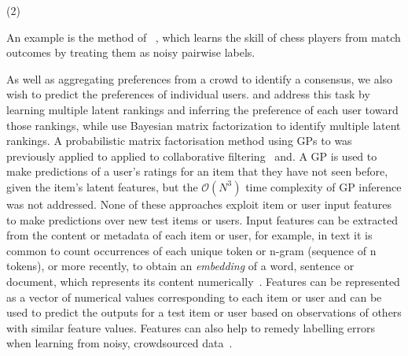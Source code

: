 (2) 

An example is the method of ~\citet{herbrich2007trueskill}, which learns the skill of chess players from 
match outcomes by treating them as noisy pairwise labels.

As well as aggregating preferences from a crowd to identify a consensus,
we also wish to predict the preferences of individual users.
\citet{yi_inferring_2013} and \citet{kim2014latent} address this task by learning
 multiple latent rankings and inferring
the preference of each user toward those rankings, while 
\citet{salimans2012collaborative} use Bayesian matrix factorization to identify multiple
latent rankings.
A probabilistic matrix factorisation method using GPs to
was previously applied to  applied to collaborative filtering~\citep{lawrence2009non} and.
A GP is used to make predictions of a user's ratings for an item that they have not seen before, given the
item's latent features, but the $\mathcal{O}(N^3)$ time complexity of GP inference was not addressed.
None of these approaches exploit item or user 
input features to make predictions over new test items or users. %
Input features can be extracted from the content or metadata of each item or user, for example, in text 
it is common to count occurrences of each unique token or n-gram (sequence of n tokens),
or more recently, to obtain an \emph{embedding} of a word, sentence or document,
which represents its content numerically~\citep{mikolov2013distributed,devlin2018bert}.
Features can be represented as a vector of numerical values corresponding to each item or user
and can be used to predict the outputs for a test item or user based on observations of others with similar feature values.
Features can also help to remedy labelling errors when learning from noisy, crowdsourced data~\citep{felt2016semantic,simpson2015language}.


